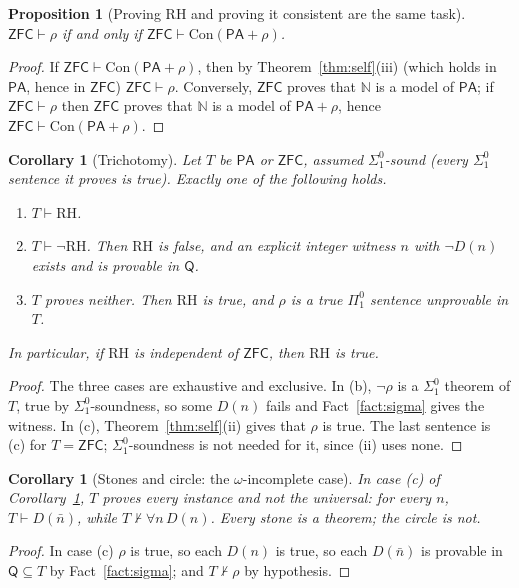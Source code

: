 \documentclass[11pt]{article}
\newtheorem{proposition}[theorem]{Proposition}
\newtheorem{corollary}[theorem]{Corollary}
\theoremstyle{definition}
\theoremstyle{remark}
\newcommand{\N}{\mathbb N}
\newcommand{\PA}{\mathsf{PA}}
\newcommand{\ZFC}{\mathsf{ZFC}}
\newcommand{\RA}{\mathsf{Q}}
\newcommand{\Con}{\mathrm{Con}}
\newcommand{\RH}{\mathrm{RH}}
\newcommand{\Pione}{\Pi^0_1}
\newcommand{\Sigone}{\Sigma^0_1}
\begin{document}
\begin{proposition}[Proving $\RH$ and proving it consistent are the same task]\label{prop:same}
$\ZFC\vdash\rho$ if and only if $\ZFC\vdash\Con(\PA+\rho)$.
\end{proposition}

\begin{proof}
If $\ZFC\vdash\Con(\PA+\rho)$, then by Theorem~\ref{thm:self}(iii) (which holds in $\PA$, hence in $\ZFC$) $\ZFC\vdash\rho$. Conversely, $\ZFC$ proves that $\N$ is a model of $\PA$; if $\ZFC\vdash\rho$ then $\ZFC$ proves that $\N$ is a model of $\PA+\rho$, hence $\ZFC\vdash\Con(\PA+\rho)$.
\end{proof}

\begin{corollary}[Trichotomy]\label{cor:tri}
Let $T$ be $\PA$ or $\ZFC$, assumed $\Sigone$-sound (every $\Sigone$ sentence it proves is true). Exactly one of the following holds.
\begin{enumerate}
\item[(a)] $T\vdash\RH$.
\item[(b)] $T\vdash\neg\RH$. Then $\RH$ is false, and an explicit integer witness $n$ with $\neg D(n)$ exists and is provable in $\RA$.
\item[(c)] $T$ proves neither. Then $\RH$ is true, and $\rho$ is a true $\Pione$ sentence unprovable in $T$.
\end{enumerate}
In particular, if $\RH$ is independent of $\ZFC$, then $\RH$ is true.
\end{corollary}

\begin{proof}
The three cases are exhaustive and exclusive. In (b), $\neg\rho$ is a $\Sigone$ theorem of $T$, true by $\Sigone$-soundness, so some $D(n)$ fails and Fact~\ref{fact:sigma} gives the witness. In (c), Theorem~\ref{thm:self}(ii) gives that $\rho$ is true. The last sentence is (c) for $T=\ZFC$; $\Sigone$-soundness is not needed for it, since (ii) uses none.
\end{proof}

\begin{corollary}[Stones and circle: the $\omega$-incomplete case]\label{cor:omega}
In case (c) of Corollary~\ref{cor:tri}, $T$ proves every instance and not the universal: for every $n$, $T\vdash D(\bar n)$, while $T\nvdash\forall n\,D(n)$. Every stone is a theorem; the circle is not.
\end{corollary}

\begin{proof}
In case (c) $\rho$ is true, so each $D(n)$ is true, so each $D(\bar n)$ is provable in $\RA\subseteq T$ by Fact~\ref{fact:sigma}; and $T\nvdash\rho$ by hypothesis.
\end{proof}
\end{document}
